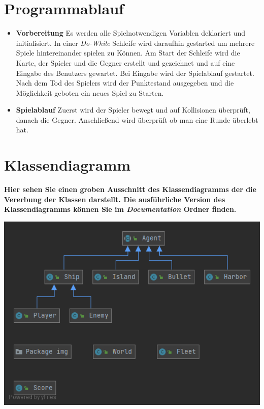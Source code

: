 \documentclass{article}
\begin{document}
\section{Programmablauf}
\begin{itemize}
    \item \textbf{Vorbereitung}
        \newline
        Es werden alle Spielnotwendigen Variablen deklariert und initialisiert. In einer \textit{Do-While} Schleife wird daraufhin gestarted um mehrere Spiele hintereinander spielen zu Können. Am Start der Schleife wird die Karte, der Spieler und die Gegner erstellt und gezeichnet und auf eine Eingabe des Benutzers gewartet. Bei Eingabe wird der Spielablauf gestartet. Nach dem Tod des Spielers wird der Punktestand ausgegeben und die Möglichkeit geboten ein neues Spiel zu Starten.
    \item \textbf{Spielablauf}
        \newline
        Zuerst wird der Spieler bewegt und auf Kollisionen überprüft, danach die Gegner. Anschließend wird überprüft ob man eine Runde überlebt hat.
\end{itemize}
\newpage

\section{Klassendiagramm}
\newline
\textbf{Hier sehen Sie einen groben Ausschnitt des Klassendiagramms der die Vererbung der Klassen darstellt. Die ausführliche Version des Klassendiagramms können Sie im \textit{Documentation} Ordner finden.}
\newline

\includegraphics[width=\textwidth,height=\textheight,keepaspectratio]{./images/Rough_UML.png}
\newpage
\end{document}
